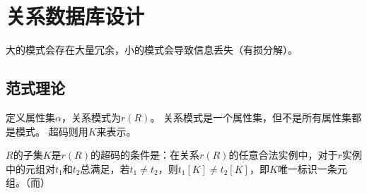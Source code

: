 
\section{关系数据库设计} %
大的模式会存在大量冗余，小的模式会导致信息丢失（有损分解）。

\subsection{范式理论}
定义属性集$\alpha$，关系模式为$r(R)$。
关系模式是一个属性集，但不是所有属性集都是模式。
超码则用$K$来表示。
\begin{definition}[超码]
$R$的子集$K$是$r(R)$的超码的条件是：在关系$r(R)$的任意合法实例中，对于$r$实例中的元组对$t_1$和$t_2$总满足，若$t_1\ne t_2$，则$t_1[K]\ne t_2[K]$，即$K$唯一标识一条元组。（而）
\end{definition}

